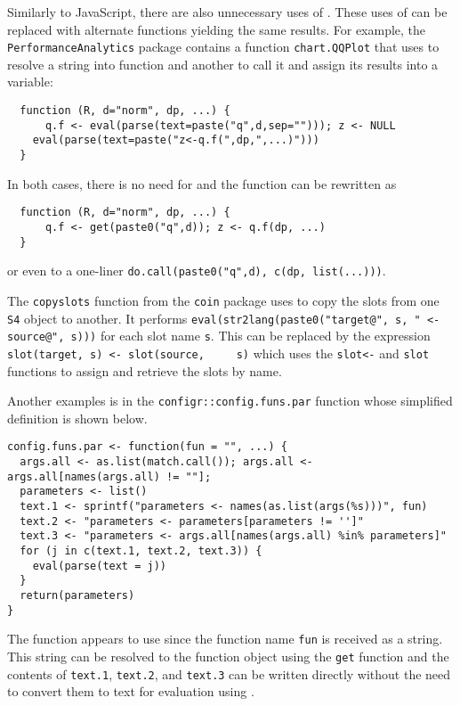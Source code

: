 \documentclass[screen,acmsmall]{acmart}%
\newcommand{\code}[1]{\lstinline |#1|\xspace}
\begin{document}
Similarly to JavaScript, there are also unnecessary uses of \eval. These uses of
\eval can be replaced with alternate functions yielding the same results. For
example, the \code{PerformanceAnalytics} package contains a function
\code{chart.QQPlot} that uses \eval to resolve a string into function and another
to call it and assign its results into a variable:
\begin{lstlisting}
  function (R, d="norm", dp, ...) {
	  q.f <- eval(parse(text=paste("q",d,sep=""))); z <- NULL
  	eval(parse(text=paste("z<-q.f(",dp,",...)")))
  }
\end{lstlisting}
  In both cases, there is no need for \eval and the function can be rewritten as
\begin{lstlisting}
  function (R, d="norm", dp, ...) {
	  q.f <- get(paste0("q",d)); z <- q.f(dp, ...)
  }
\end{lstlisting}
  or even to a one-liner \code{do.call(paste0("q",d), c(dp, list(...)))}.


  The \code{copyslots} function from the \code{coin} package uses \eval to copy the
  slots from one \code{S4} object to another. It performs
  \code{eval(str2lang(paste0("target@", s, " <- source@", s)))} for each slot name
  \code{s}. This can be replaced by the expression \code{slot(target, s) <- slot(source,
    s)} which uses the \code{slot<-} and \code{slot} functions to assign and retrieve
  the slots by name.

  Another examples is in the \code{configr::config.funs.par} function whose
  simplified definition is shown below.

\begin{lstlisting}
config.funs.par <- function(fun = "", ...) {
  args.all <- as.list(match.call()); args.all <- args.all[names(args.all) != ""];
  parameters <- list()
  text.1 <- sprintf("parameters <- names(as.list(args(%s)))", fun)
  text.2 <- "parameters <- parameters[parameters != '']"
  text.3 <- "parameters <- args.all[names(args.all) %in% parameters]"
  for (j in c(text.1, text.2, text.3)) {
    eval(parse(text = j))
  }
  return(parameters)
}
\end{lstlisting}

  The function appears to use \eval since the function name \code{fun} is received
  as a string. This string can be resolved to the function object using the
  \code{get} function and the contents of \code{text.1}, \code{text.2}, and \code{text.3}
  can be written directly without the need to convert them to text for
  evaluation using \eval.
\end{document}

